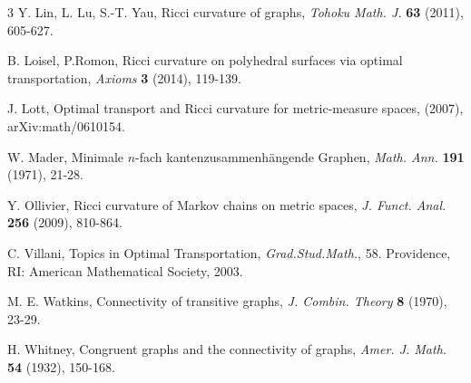\documentclass[11pt,bezier]{article}
\theoremstyle{definition}
\theoremstyle{definition}
\theoremstyle{nonumber}
\begin{document}
\begin{thebibliography}{3}
Y. Lin, L. Lu, S.-T. Yau, Ricci curvature of graphs, \emph{Tohoku Math. J.} \textbf{63} (2011), 605-627.

B. Loisel, P.Romon, Ricci curvature on polyhedral surfaces via optimal transportation, \emph{Axioms} \textbf{3} (2014), 119-139.

J. Lott, Optimal transport and Ricci curvature for metric-measure spaces, (2007), arXiv:math/0610154.

 W. Mader, Minimale $n$-fach kantenzusammenhängende Graphen, \emph{Math. Ann.} \textbf{191} (1971), 21-28.

Y. Ollivier, Ricci curvature of Markov chains on metric spaces, \emph{J. Funct. Anal.} \textbf{256} (2009), 810-864.

C. Villani, Topics in Optimal Transportation, \emph{Grad.Stud.Math.}, 58. Providence, RI: American Mathematical Society, 2003.

 M. E. Watkins, Connectivity of transitive graphs, \emph{J. Combin. Theory} \textbf{8} (1970), 23-29.

 H. Whitney, Congruent graphs and the connectivity of graphs, \emph{Amer. J. Math.} \textbf{54} (1932), 150-168.
\end{thebibliography}
\end{document}
